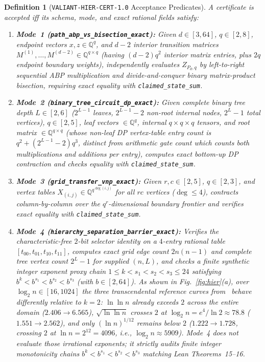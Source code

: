 \documentclass[10pt,twocolumn]{article}
\newtheorem{definition}[theorem]{Definition}
\newcommand{\QQ}{\mathbb{Q}}
\newcommand{\certschema}{\texttt{VALIANT-HIER-CERT-1.0}}
\begin{document}
\begin{definition}[\certschema{} Acceptance Predicates]\label{def:spec}
\normalfont A certificate is accepted iff its schema, mode, and exact rational fields satisfy:
\begin{enumerate}[leftmargin=1.2em,itemsep=1pt,topsep=2pt]
  \item \textbf{Mode~1 (\texttt{path\_abp\_vs\_bisection\_exact}):} Given $d\in[3,64]$, $q\in[2,8]$, endpoint vectors $x,z\in\QQ^q$, and $d-2$ interior transition matrices $M^{(1)},\dots,M^{(d-2)}\in\QQ^{q\times q}$ (having $(d-2)q^2$ interior matrix entries, plus $2q$ endpoint boundary weights), independently evaluates $Z_{P_d,q}$ by left-to-right sequential ABP multiplication and divide-and-conquer binary matrix-product bisection, requiring exact equality with \texttt{claimed\_state\_sum}.
  \item \textbf{Mode~2 (\texttt{binary\_tree\_circuit\_dp\_exact}):} Given complete binary tree depth $L\in[2,6]$ ($2^{L-1}$ leaves, $2^{L-1}-2$ non-root internal nodes, $2^L-1$ total vertices), $q\in[2,5]$, leaf vectors $\in\QQ^q$, internal $q\times q\times q$ tensors, and root matrix $\in\QQ^{q\times q}$ (whose non-leaf DP vertex-table entry count is $q^2 + (2^{L-1}-2)q^3$, distinct from arithmetic gate count which counts both multiplications and additions per entry), computes exact bottom-up DP contraction and checks equality with \texttt{claimed\_state\_sum}.
  \item \textbf{Mode~3 (\texttt{grid\_transfer\_vnp\_exact}):} Given $r,c\in[2,5]$, $q\in[2,3]$, and vertex tables $X_{(i,j)}\in\QQ^{q^{\deg(i,j)}}$ for all $rc$ vertices ($\deg\le 4$), contracts column-by-column over the $q^r$-dimensional boundary frontier and verifies exact equality with \texttt{claimed\_state\_sum}.
  \item \textbf{Mode~4 (\nolinkurl{hierarchy_separation_barrier_exact}):} Verifies the characteristic-free $2$-bit selector identity on a $4$-entry rational table $[t_{00},t_{01},t_{10},t_{11}]$, computes exact grid edge count $2n(n-1)$ and complete tree vertex count $2^L-1$ for supplied $(n,L)$, and checks a finite synthetic integer exponent proxy chain $1\le k < s_1 < s_2 < s_3 \le 24$ satisfying $b^k < b^{s_1} < b^{s_2} < b^{s_3}$ (with $b\in[2,64]$). As shown in Fig.~\ref{fig:hier}(a), over $\log_2 n\in[16,1024]$ the three transcendental reference curves from~\cite{openai2026hierarchy} behave differently relative to $k=2$: $\ln\ln n$ already exceeds $2$ across the entire domain ($2.406\to 6.565$), $\sqrt{\ln\ln n}$ crosses $2$ at $\log_2 n = e^4/\ln 2 \approx 78.8$ ($1.551\to 2.562$), and only $(\ln n)^{1/12}$ remains below $2$ ($1.222\to 1.728$, crossing $2$ at $\ln n = 2^{12} = 4096$, i.e., $\log_2 n \approx 5909$). Mode~4 does not evaluate those irrational exponents; it strictly audits finite integer monotonicity chains $b^k < b^{s_1} < b^{s_2} < b^{s_3}$ matching Lean Theorems~15--16.
\end{enumerate}
\end{definition}
\end{document}
